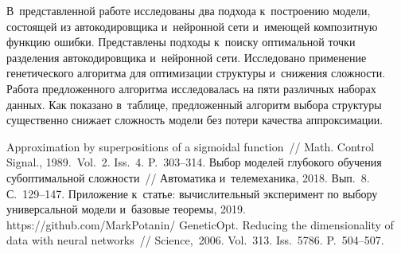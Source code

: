 \begin{multicols}{2}
В~представленной работе исследованы два подхода к~построению модели, 
состоящей из автокодировщика и~нейронной сети и~имеющей композитную функцию 
ошибки. Представлены \mbox{подходы} к~поиску оптимальной точки разделения 
автокодировщика и~нейронной сети. Исследовано применение генетического 
алгоритма для оптимизации структуры и~снижения сложности. Работа 
предложенного алгоритма исследовалась на пяти различных наборах данных. Как 
показано в~таб\-ли\-це, предложенный алгоритм выбора структуры  
существенно снижает сложность модели без потери качества аппроксимации.

{\small\frenchspacing
 {%
 \begin{thebibliography}{99}

 Approximation by superpositions of a 
sigmoidal function~// Math. Control Signal., 1989.~Vol.~2. 
Iss.~4. P.~303--314.
 Выбор моделей глубокого 
обучения субоптимальной сложности~// Автоматика и~телемеханика, 2018. Вып.~8. С.~129--147.
 Приложение к~статье: вы\-чис\-ли\-тель\-ный эксперимент по выбору 
универсальной модели и~базовые теоремы, 2019. {\sf 
https://github.com/MarkPotanin/ GeneticOpt}.
 Reducing the 
dimensionality of data with neural networks~// Science,~2006. Vol.~313. 
Iss.~5786. P.~504--507.


\end{thebibliography}}}
\end{multicols}
